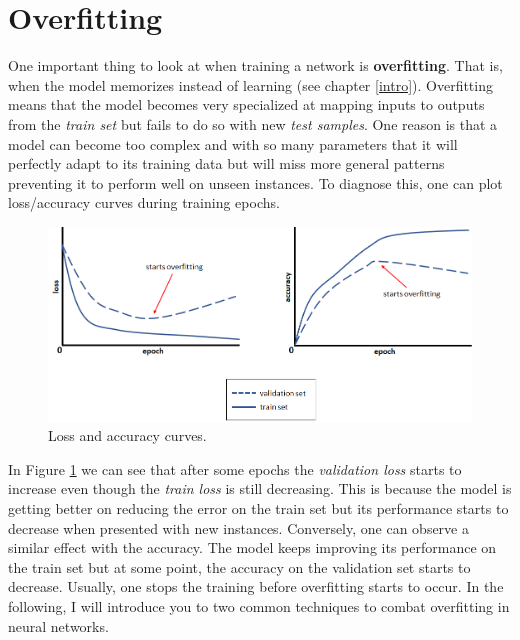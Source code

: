 \documentclass[
  11pt,
]{krantz}
\begin{document}
\hypertarget{overfitting}{%
\section{Overfitting}\label{overfitting}}

One important thing to look at when training a network is \textbf{overfitting}. That is, when the model memorizes instead of learning (see chapter \ref{intro}). Overfitting means that the model becomes very specialized at mapping inputs to outputs from the \emph{train set} but fails to do so with new \emph{test samples}. One reason is that a model can become too complex and with so many parameters that it will perfectly adapt to its training data but will miss more general patterns preventing it to perform well on unseen instances. To diagnose this, one can plot loss/accuracy curves during training epochs.

\begin{figure}

{\centering \includegraphics[width=1\linewidth]{images/nn_loss_accuracy_curves} 

}

\caption{Loss and accuracy curves.}\label{fig:lossAccuracy}
\end{figure}

In Figure \ref{fig:lossAccuracy} we can see that after some epochs the \emph{validation loss} starts to increase even though the \emph{train loss} is still decreasing. This is because the model is getting better on reducing the error on the train set but its performance starts to decrease when presented with new instances. Conversely, one can observe a similar effect with the accuracy. The model keeps improving its performance on the train set but at some point, the accuracy on the validation set starts to decrease. Usually, one stops the training before overfitting starts to occur. In the following, I will introduce you to two common techniques to combat overfitting in neural networks.
\end{document}

